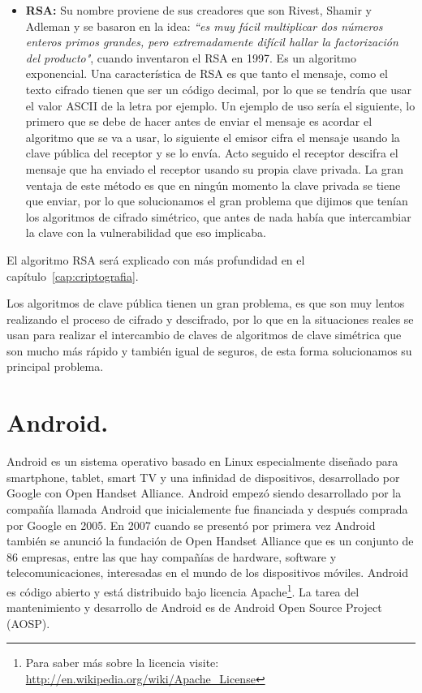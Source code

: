 \begin{itemize}

	\item \textbf{RSA:} Su nombre proviene de sus creadores que son Rivest, Shamir y Adleman y se basaron en la idea: \textit{``es muy fácil multiplicar dos números enteros primos grandes, pero extremadamente difícil hallar la factorización del producto"}, cuando inventaron el RSA en 1997. Es un algoritmo exponencial. Una característica de RSA es que tanto el mensaje, como el texto cifrado tienen que ser un código decimal, por lo que se tendría que usar el valor ASCII de la letra por ejemplo. Un ejemplo de uso sería el siguiente, lo primero que se debe de hacer antes de enviar el mensaje es acordar el algoritmo que se va a usar, lo siguiente el emisor cifra el mensaje usando la clave pública del receptor y se lo envía. Acto seguido el receptor descifra el mensaje que ha enviado el receptor usando su propia clave privada. La gran ventaja de este método es que en ningún momento la clave privada se tiene que enviar, por lo que solucionamos el gran problema que dijimos que tenían los algoritmos de cifrado simétrico, que antes de nada había que intercambiar la clave con la vulnerabilidad que eso implicaba. 

\end{itemize}

El algoritmo RSA será explicado con más profundidad en el capítulo~\ref{cap:criptografia}.

Los algoritmos de clave pública tienen un gran problema, es que son muy lentos realizando el proceso de cifrado y descifrado, por lo que en la situaciones reales se usan para realizar el intercambio de claves de algoritmos de clave simétrica que son mucho más rápido y también igual de seguros, de esta forma solucionamos su principal problema.

\section{Android.}

Android es un sistema operativo basado en Linux especialmente diseñado para smartphone, tablet, smart TV y una infinidad de dispositivos, desarrollado por Google con Open Handset Alliance. Android empezó siendo desarrollado por la compañía llamada Android que inicialemente fue financiada y después comprada por Google en 2005. En 2007 cuando se presentó por primera vez Android también se anunció la fundación de Open Handset Alliance que es un conjunto de 86 empresas, entre las que hay compañías de hardware, software y telecomunicaciones, interesadas en el mundo de los dispositivos móviles. Android es código abierto y está distribuido bajo licencia Apache\footnote{Para saber más sobre la licencia visite: \url{http://en.wikipedia.org/wiki/Apache\_License}}. La tarea del mantenimiento y desarrollo de Android es de Android Open Source Project (AOSP).

